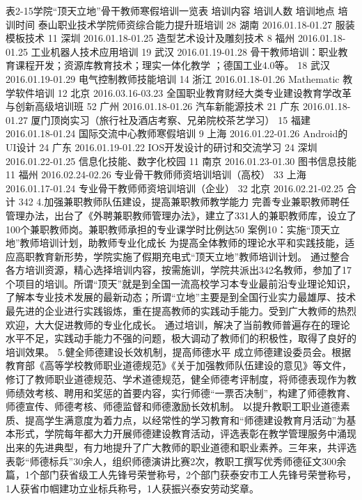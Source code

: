 表2-15学院“顶天立地”骨干教师寒假培训一览表
培训内容
培训人数
培训地点
培训时间
泰山职业技术学院师资综合能力提升班培训
28
湖南
2016.01.18-01.27
服装模板技术
11
深圳
2016.01.18-01.25
造型艺术设计及雕刻技术
8
福州
2016.01.18-01.25
工业机器人技术应用培训
19
武汉
2016.01.19-01.28
骨干教师培训：职业教育课程开发；资源库教育技术；理实一体化教学 ；德国工业4.0等。
18
武汉
2016.01.19-01.29
电气控制教师技能培训
14
 浙江
2016.01.18-01.26
Mathematic 教学软件培训
12
北京
2016.03.16-03.23
全国职业教育财经大类专业建设教育学改革与创新高级培训班
52
广州
2016.01.18-01.26
汽车新能源技术
21
广东
2016.01.18-01.27
厦门顶岗实习（旅行社及酒店考察、兄弟院校茶艺学习）
15
福建
2016.01.18-01.24
国际交流中心教师寒假培训
9
上海
2016.01.22-01.26
Android的UI设计
24
广东
2016.01.19-01.22
IOS开发设计的研讨和交流学习
24
深圳
2016.01.22-01.25
信息化技能、数字化校园
11
南京
2016.01.23-01.30
图书信息技能
11
福州
2016.02.24-02.26
专业骨干教师师资培训培训（高校）
33
上海
2016.01.17-01.24
专业骨干教师师资培训培训（企业）
32
北京
2016.02.21-02.25
合   计
342
4.加强兼职教师队伍建设，提高兼职教师教学能力
完善专业兼职教师聘任管理办法，出台了《外聘兼职教师管理办法》，建立了331人的兼职教师库，设立了100个兼职教师岗。兼职教师承担的专业课学时比例达50%
案例10：实施“顶天立地”教师培训计划，助教师专业化成长
为提高全体教师的理论水平和实践技能，适应高职教育新形势，学院实施了假期充电式“顶天立地”教师培训计划。
通过整合各方培训资源，精心选择培训内容，按需施训，学院共派出342名教师，参加了17个项目的培训。所谓“顶天”就是到全国一流高校学习本专业最前沿专业理论知识，了解本专业技术发展的最新动态；所谓“立地”主要是到全国行业实力最雄厚、技术最先进的企业进行实践锻炼，重在提高教师的实践动手能力。受到广大教师的热烈欢迎，大大促进教师的专业化成长。
通过培训，解决了当前教师普遍存在的理论水平不足，实践动手能力不强的问题，极大调动了教师们的积极性，取得了良好的培训效果。
5.健全师德建设长效机制，提高师德水平
成立师德建设委员会。根据教育部《高等学校教师职业道德规范》《关于加强教师队伍建设的意见》等文件，修订了教师职业道德规范、学术道德规范，健全师德考评制度，将师德表现作为教师绩效考核、聘用和奖惩的首要内容，实行师德“一票否决制”，构建了师德教育、师德宣传、师德考核、师德监督和师德激励长效机制。
以提升教职工职业道德素质、提高学生满意度为着力点，以经常性的学习教育和“师德建设教育月活动”为基本形式，学院每年都大力开展师德建设教育活动，评选表彰在教学管理服务中涌现出来的先进典型，有力地提升了广大教师的职业道德和职业素养。三年来，共评选表彰“师德标兵”30余人，组织师德演讲比赛2次，教职工撰写优秀师德征文300余篇，1个部门获省级工人先锋号荣誉称号，2个部门获泰安市工人先锋号荣誉称号，1人获省巾帼建功立业标兵称号，1人获振兴泰安劳动奖章。
